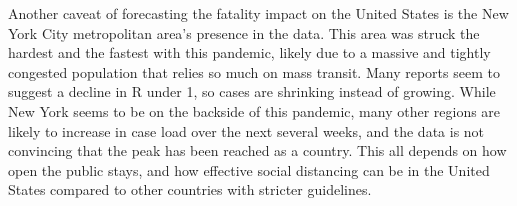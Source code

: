 Another caveat of forecasting the fatality impact on the United States is the New York City metropolitan area's presence in the data.  This area was struck the hardest and the fastest with this pandemic, likely due to a massive and tightly congested population that relies so much on mass transit.  Many reports seem to suggest a decline in R under 1, so cases are shrinking instead of growing.  While New York seems to be on the backside of this pandemic, many other regions are likely to increase in case load over the next several weeks, and the data is not convincing that the peak has been reached as a country.  This all depends on how open the public stays, and how effective social distancing can be in the United States compared to other countries with stricter guidelines. 

